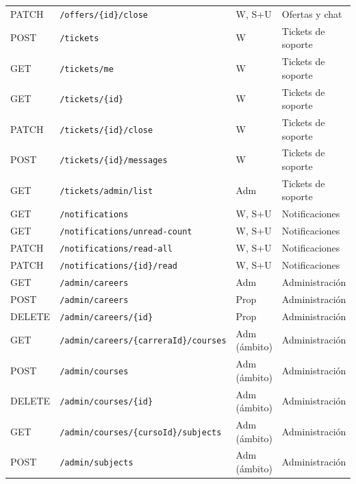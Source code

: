 \documentclass[11pt,a4paper]{report}
\begin{document}
\begin{center}
\begin{longtable}{@{}lp{7.3cm}p{2.8cm}p{3.4cm}@{}}
PATCH & \texttt{/\allowbreak{}offers/\allowbreak{}\{id\}/\allowbreak{}close} & W, S+U & Ofertas y chat\\
POST & \texttt{/\allowbreak{}tickets} & W & Tickets de soporte\\
GET & \texttt{/\allowbreak{}tickets/\allowbreak{}me} & W & Tickets de soporte\\
GET & \texttt{/\allowbreak{}tickets/\allowbreak{}\{id\}} & W & Tickets de soporte\\
PATCH & \texttt{/\allowbreak{}tickets/\allowbreak{}\{id\}/\allowbreak{}close} & W & Tickets de soporte\\
POST & \texttt{/\allowbreak{}tickets/\allowbreak{}\{id\}/\allowbreak{}messages} & W & Tickets de soporte\\
GET & \texttt{/\allowbreak{}tickets/\allowbreak{}admin/\allowbreak{}list} & Adm & Tickets de soporte\\
GET & \texttt{/\allowbreak{}notifications} & W, S+U & Notificaciones\\
GET & \texttt{/\allowbreak{}notifications/\allowbreak{}unread-count} & W, S+U & Notificaciones\\
PATCH & \texttt{/\allowbreak{}notifications/\allowbreak{}read-all} & W, S+U & Notificaciones\\
PATCH & \texttt{/\allowbreak{}notifications/\allowbreak{}\{id\}/\allowbreak{}read} & W, S+U & Notificaciones\\
GET & \texttt{/\allowbreak{}admin/\allowbreak{}careers} & Adm & Administración\\
POST & \texttt{/\allowbreak{}admin/\allowbreak{}careers} & Prop & Administración\\
DELETE & \texttt{/\allowbreak{}admin/\allowbreak{}careers/\allowbreak{}\{id\}} & Prop & Administración\\
GET & \texttt{/\allowbreak{}admin/\allowbreak{}careers/\allowbreak{}\{carreraId\}/\allowbreak{}courses} & Adm (ámbito) & Administración\\
POST & \texttt{/\allowbreak{}admin/\allowbreak{}courses} & Adm (ámbito) & Administración\\
DELETE & \texttt{/\allowbreak{}admin/\allowbreak{}courses/\allowbreak{}\{id\}} & Adm (ámbito) & Administración\\
GET & \texttt{/\allowbreak{}admin/\allowbreak{}courses/\allowbreak{}\{cursoId\}/\allowbreak{}subjects} & Adm (ámbito) & Administración\\
POST & \texttt{/\allowbreak{}admin/\allowbreak{}subjects} & Adm (ámbito) & Administración\\

\end{longtable}
\end{center}
\end{document}
